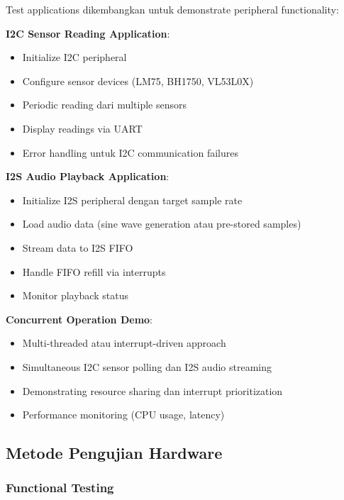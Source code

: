 Test applications dikembangkan untuk demonstrate peripheral functionality:

\textbf{I2C Sensor Reading Application}:
\begin{itemize}
	\item Initialize I2C peripheral
	\item Configure sensor devices (LM75, BH1750, VL53L0X)
	\item Periodic reading dari multiple sensors
	\item Display readings via UART
	\item Error handling untuk I2C communication failures
\end{itemize}

\textbf{I2S Audio Playback Application}:
\begin{itemize}
	\item Initialize I2S peripheral dengan target sample rate
	\item Load audio data (sine wave generation atau pre-stored samples)
	\item Stream data to I2S FIFO
	\item Handle FIFO refill via interrupts
	\item Monitor playback status
\end{itemize}

\textbf{Concurrent Operation Demo}:
\begin{itemize}
	\item Multi-threaded atau interrupt-driven approach
	\item Simultaneous I2C sensor polling dan I2S audio streaming
	\item Demonstrating resource sharing dan interrupt prioritization
	\item Performance monitoring (CPU usage, latency)
\end{itemize}

\subsection{Metode Pengujian Hardware}

\subsubsection{Functional Testing}

